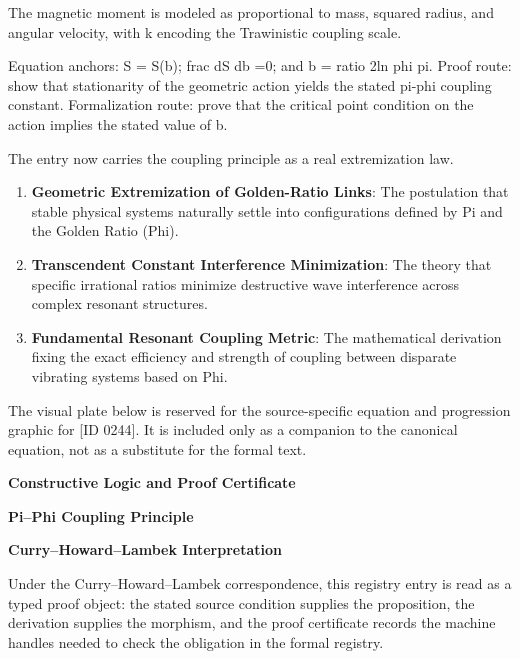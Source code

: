 The magnetic moment is modeled as proportional to mass, squared radius, and angular velocity, with k encoding the Trawinistic coupling scale.

Equation anchors: S = S(b); frac dS db =0; and b = ratio 2ln phi pi. Proof route: show that stationarity of the geometric action yields the stated pi-phi coupling constant. Formalization route: prove that the critical point condition on the action implies the stated value of b.

The entry now carries the coupling principle as a real extremization law.
\endgroup

\begin{enumerate}[leftmargin=1.6em,itemsep=6pt,topsep=4pt]
\item \textbf{Geometric Extremization of Golden-Ratio Links}: The postulation that stable physical systems naturally settle into configurations defined by Pi and the Golden Ratio (Phi).
\item \textbf{Transcendent Constant Interference Minimization}: The theory that specific irrational ratios minimize destructive wave interference across complex resonant structures.
\item \textbf{Fundamental Resonant Coupling Metric}: The mathematical derivation fixing the exact efficiency and strength of coupling between disparate vibrating systems based on Phi.
\end{enumerate}

\begingroup\footnotesize\sloppy
The visual plate below is reserved for the source-specific equation and progression graphic for [ID 0244]. It is included only as a companion to the canonical equation, not as a substitute for the formal text.
\par\endgroup
\ifTZPDarkEdition
{}
\fi

\clearpage
\begingroup\tzpsupportsetup
\noindent\textbf{\fontsize{10.8pt}{12.8pt}\selectfont [ID 0244] Constructive Logic and Proof Certificate}\par
\noindent\textbf{\fontsize{10pt}{12pt}\selectfont Pi--Phi Coupling Principle}\par
\vspace{0.45em}
\begingroup
\footnotesize
\setlength{\parskip}{0.22em}
\setlength{\parindent}{0pt}
\noindent\textbf{Curry--Howard--Lambek Interpretation}\par
Under the Curry--Howard--Lambek correspondence, this registry entry is read as a typed proof
object: the stated source condition supplies the proposition, the derivation supplies the
morphism, and the proof certificate records the machine handles needed to check the obligation
in the formal registry.

